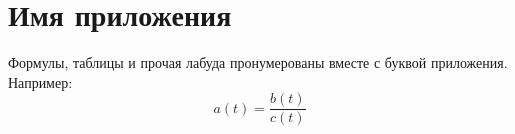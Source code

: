 \section{Имя приложения}
\label{appendix_label}

Формулы, таблицы и прочая лабуда пронумерованы вместе с буквой приложения. Например:
\begin{equation}
    a(t) = \frac{b(t)}{c(t)}
\end{equation}